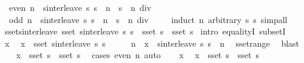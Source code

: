 \begin{isabellebody}
\ \ {\isachardoublequoteopen}even\ n\ {\isasymLongrightarrow}\ sinterleave\ s{}\ s{}\ {\isacharbang}{\isacharbang}\ n\ {\isacharequal}\ s{}\ {\isacharbang}{\isacharbang}\ {\isacharparenleft}n\ div\ {}{\isacharparenright}{\isachardoublequoteclose}\isanewline
\ \ {\isachardoublequoteopen}odd\ n\ {\isasymLongrightarrow}\ sinterleave\ s{}\ s{}\ {\isacharbang}{\isacharbang}\ n\ {\isacharequal}\ s{}\ {\isacharbang}{\isacharbang}\ {\isacharparenleft}n\ div\ {}{\isacharparenright}{\isachardoublequoteclose}\isanewline
%
\isadelimproof
\ \ %
\endisadelimproof
%
\isatagproof
{}\isamarkupfalse%
\ {\isacharparenleft}induct\ n\ arbitrary{\isacharcolon}\ s{}\ s{}{\isacharparenright}\ simp{\isacharunderscore}all%
\endisatagproof
{\isafoldproof}%
%
\isadelimproof
\isanewline
%
\endisadelimproof
\isanewline
{}\isamarkupfalse%
\ sset{\isacharunderscore}sinterleave{\isacharcolon}\ {\isachardoublequoteopen}sset\ {\isacharparenleft}sinterleave\ s{}\ s{}{\isacharparenright}\ {\isacharequal}\ sset\ s{}\ {\isasymunion}\ sset\ s{}{\isachardoublequoteclose}\isanewline
%
\isadelimproof
%
\endisadelimproof
%
\isatagproof
{}\isamarkupfalse%
\ {\isacharparenleft}intro\ equalityI\ subsetI{\isacharparenright}\isanewline
\ \ \isamarkupfalse%
\ x\ \isamarkupfalse%
\ {\isachardoublequoteopen}x\ {\isasymin}\ sset\ {\isacharparenleft}sinterleave\ s{}\ s{}{\isacharparenright}{\isachardoublequoteclose}\isanewline
\ \ \isamarkupfalse%
\ \isamarkupfalse%
\ n\ \ {\isachardoublequoteopen}x\ {\isacharequal}\ sinterleave\ s{}\ s{}\ {\isacharbang}{\isacharbang}\ n{\isachardoublequoteclose}\ \isamarkupfalse%
\ sset{\isacharunderscore}range\ \isamarkupfalse%
\ blast\isanewline
\ \ \isamarkupfalse%
\ {\isachardoublequoteopen}x\ {\isasymin}\ sset\ s{}\ {\isasymunion}\ sset\ s{}{\isachardoublequoteclose}\ \isamarkupfalse%
\ {\isacharparenleft}cases\ {\isachardoublequoteopen}even\ n{\isachardoublequoteclose}{\isacharparenright}\ auto\isanewline
{}\isamarkupfalse%
\isanewline
\ \ \isamarkupfalse%
\ x\ \isamarkupfalse%
\ {\isachardoublequoteopen}x\ {\isasymin}\ sset\ s{}\ {\isasymunion}\ sset\ s{}{\isachardoublequoteclose}\isanewline

\end{isabellebody}
